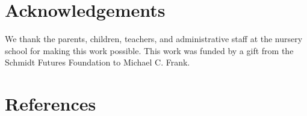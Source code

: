 \documentclass[10pt, letterpaper]{article}
\begin{document}
\hypertarget{acknowledgements}{%
\section{Acknowledgements}\label{acknowledgements}}

We thank the parents, children, teachers, and administrative staff at
the nursery school for making this work possible. This work was funded
by a gift from the Schmidt Futures Foundation to Michael C. Frank.

\hypertarget{references}{%
\section{References}\label{references}}

\setlength{\parindent}{-0.1in} 
\setlength{\leftskip}{0.125in}

\noindent
\end{document}
